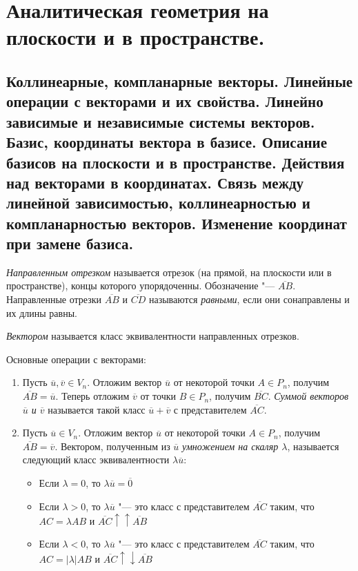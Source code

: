 \section{Аналитическая геометрия на плоскости и в пространстве.}

\subsection{Коллинеарные, компланарные векторы. Линейные операции с векторами и их свойства. Линейно зависимые и независимые системы векторов. Базис, координаты вектора в базисе. Описание базисов на плоскости и в пространстве. Действия над векторами в координатах. Связь между линейной зависимостью, коллинеарностью и компланарностью векторов. Изменение координат при замене базиса.}
    
    \begin{definition}
    	\textit{Направленным отрезком} называется отрезок (на прямой, на плоскости или в пространстве), концы которого упорядоченны. Обозначение "--- $\overline{AB}$. Направленные отрезки $\overline{AB}$ и $\overline{CD}$ называются \textit{равными}, если они сонаправлены и их длины равны.
    \end{definition}
    
    \begin{definition}
    	\textit{Вектором} называется класс эквивалентности направленных отрезков.
    \end{definition}
    
    \begin{definition}
    	Основные операции с векторами:
    	\begin{enumerate}
    		\item Пусть $\overline u, \overline v \in V_n$. Отложим вектор $\overline{u}$ от некоторой точки $A \in P_n$, получим $\overline{AB} = \overline{u}$. Теперь отложим $\overline{v}$ от точки $B \in P_n$, получим $\overline{BC}$. \textit{Суммой векторов $\overline{u}$ и $\overline{v}$} называется такой класс $\overline{u} + \overline{v}$ с представителем $\overline{AC}$.
    		
    		\item Пусть $\overline u \in V_n$. Отложим вектор $\overline{u}$ от некоторой точки $A \in P_n$, получим $\overline{AB} = \overline{v}$. Вектором, полученным из $\overline u$ \textit{умножением на скаляр $\lambda$}, называется следующий класс эквивалентности $\lambda \overline{u}$:
    		\begin{itemize}
    			\item Если $\lambda = 0$, то $\lambda \overline{u} = \overline{0}$
    			\item Если $\lambda > 0$, то $\lambda \overline{u}$ "--- это класс с представителем $\overline{AC}$ таким, что $AC = \lambda AB$ и $\overline{AC} \uparrow\uparrow \overline{AB}$
    			\item Если $\lambda < 0$, то $\lambda \overline{u}$ "--- это класс с представителем $\overline{AC}$ таким, что $AC = |\lambda| AB$ и $\overline{AC} \uparrow\downarrow \overline{AB}$
    		\end{itemize}
    	\end{enumerate}
    \end{definition}
    
